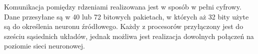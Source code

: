 \documentclass[11pt]{article}
\begin{document}
Komunikacja pomiędzy rdzeniami realizowana jest w sposób w pełni cyfrowy. Dane przesyłane są w 40 lub 72 bitowych pakietach, w których aż 32 bity użyte są do określenia neuronu źródłowego. Każdy z procesorów przyłączony jest do sześciu sąsiednich układów, jednak możliwa jest realizacja dowolnych połączeń na poziomie sieci neuronowej.





\newpage{}

\listoffigures

\newpage{}

\nocite{*}


\end{document}
